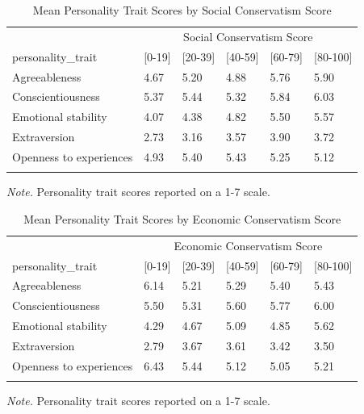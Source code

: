\documentclass[man]{apa6}
\begin{document}
\begin{table}[tbp]
\begin{center}
\begin{threeparttable}
\caption{\label{tab:table1}Mean Personality Trait Scores by Social Conservatism Score}
\begin{tabular}{llllll}
\toprule
 & \multicolumn{5}{c}{Social Conservatism Score} \\
\cmidrule(r){2-6}
personality\_trait & \multicolumn{1}{c}{[0-19]} & \multicolumn{1}{c}{[20-39]} & \multicolumn{1}{c}{[40-59]} & \multicolumn{1}{c}{[60-79]} & \multicolumn{1}{c}{[80-100]}\\
\midrule
Agreeableness & 4.67 & 5.20 & 4.88 & 5.76 & 5.90\\
Conscientiousness & 5.37 & 5.44 & 5.32 & 5.84 & 6.03\\
Emotional stability & 4.07 & 4.38 & 4.82 & 5.50 & 5.57\\
Extraversion & 2.73 & 3.16 & 3.57 & 3.90 & 3.72\\
Openness to experiences & 4.93 & 5.40 & 5.43 & 5.25 & 5.12\\
\bottomrule
\addlinespace
\end{tabular}
\begin{tablenotes}[para]
\normalsize{\textit{Note.} Personality trait scores reported on a 1-7 scale.}
\end{tablenotes}
\end{threeparttable}
\end{center}
\end{table}

\begin{table}[tbp]
\begin{center}
\begin{threeparttable}
\caption{\label{tab:table2}Mean Personality Trait Scores by Economic Conservatism Score}
\begin{tabular}{llllll}
\toprule
 & \multicolumn{5}{c}{Economic Conservatism Score} \\
\cmidrule(r){2-6}
personality\_trait & \multicolumn{1}{c}{[0-19]} & \multicolumn{1}{c}{[20-39]} & \multicolumn{1}{c}{[40-59]} & \multicolumn{1}{c}{[60-79]} & \multicolumn{1}{c}{[80-100]}\\
\midrule
Agreeableness & 6.14 & 5.21 & 5.29 & 5.40 & 5.43\\
Conscientiousness & 5.50 & 5.31 & 5.60 & 5.77 & 6.00\\
Emotional stability & 4.29 & 4.67 & 5.09 & 4.85 & 5.62\\
Extraversion & 2.79 & 3.67 & 3.61 & 3.42 & 3.50\\
Openness to experiences & 6.43 & 5.44 & 5.12 & 5.05 & 5.21\\
\bottomrule
\addlinespace
\end{tabular}
\begin{tablenotes}[para]
\normalsize{\textit{Note.} Personality trait scores reported on a 1-7 scale.}
\end{tablenotes}
\end{threeparttable}
\end{center}
\end{table}
\end{document}
